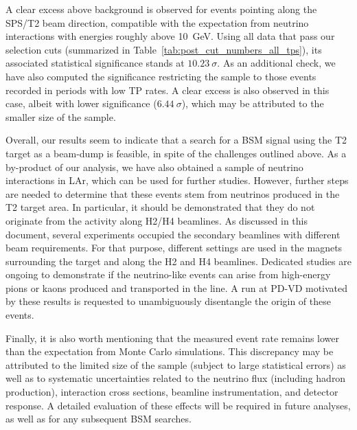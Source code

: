 A clear excess above background is observed for events pointing along the SPS/T2 beam direction, compatible with the expectation from neutrino interactions with energies roughly above 10~GeV. Using all data that pass our selection cuts (summarized in Table~\ref{tab:post_cut_numbers_all_tps}), its associated statistical significance stands at $10.23~\sigma$. As an additional check, we have also computed the significance restricting the sample to those events recorded in periods with low TP rates. A clear excess is also observed in this case, albeit with lower significance ($6.44~\sigma$), which may be attributed to the smaller size of the sample.

Overall, our results seem to indicate that a search for a BSM signal using the T2 target as a beam-dump is feasible, in spite of the challenges outlined above. As a by-product of our analysis, we have also obtained a sample of neutrino interactions in LAr, which can be used for further studies. However, further steps are needed to determine that these events stem from neutrinos produced in the T2 target area. In particular, it should be demonstrated that they do not originate from the activity along H2/H4 beamlines. As discussed in this document, several experiments occupied the secondary beamlines with different beam requirements. For that purpose, different settings are used in the magnets surrounding the target and along the H2 and H4 beamlines. Dedicated studies are ongoing to demonstrate if the neutrino-like events can arise from high-energy pions or kaons produced and transported in the line. A run at PD-VD motivated by these results is requested to unambiguously disentangle the origin of these events. 

Finally, it is also worth mentioning that the measured event rate remains lower than the expectation from Monte Carlo simulations. This discrepancy may be attributed to the limited size of the sample (subject to large statistical errors) as well as to systematic uncertainties related to the neutrino flux (including hadron production), interaction cross sections, beamline instrumentation, and detector response. A detailed evaluation of these effects will be required in future analyses, as well as for any subsequent BSM searches.

